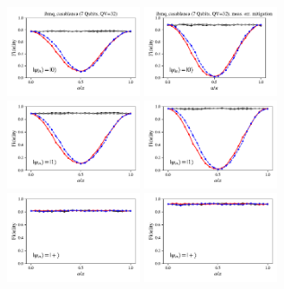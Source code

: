 \documentclass[a4paper]{article}
\begin{document}
\begin{figure}[H]
	\centering
	\includegraphics[width=0.35\textwidth]{fidelity_qc5_mit1_state0}
	\includegraphics[width=0.35\textwidth]{fidelity_qc5_mit0_state0}
	\\
	\includegraphics[width=0.35\textwidth]{fidelity_qc5_mit1_state1}
	\includegraphics[width=0.35\textwidth]{fidelity_qc5_mit0_state1}
	\\
	\includegraphics[width=0.35\textwidth]{fidelity_qc5_mit1_state2}
	\includegraphics[width=0.35\textwidth]{fidelity_qc5_mit0_state2}

\end{figure}
\end{document}
